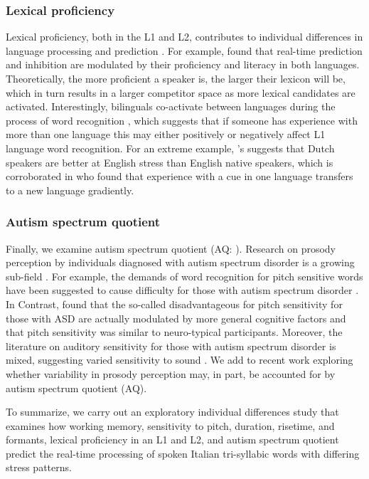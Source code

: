 \subsubsection{Lexical proficiency}
Lexical proficiency, both in the L1 and L2, contributes to individual differences in language processing and prediction \citep{Diependaele2013, Yap2012}. For example, \citep{Kukona2016} found that real-time prediction and inhibition are modulated by their proficiency and literacy in both languages. Theoretically, the more proficient a speaker is, the larger their lexicon will be, which in turn results in a larger competitor space as more lexical candidates are activated. Interestingly, bilinguals co-activate between languages during the process of word recognition \citep{kroll1997lexical, dijkstra2002architecture, marian2003competing}, which suggests that if someone has experience with more than one language this may either positively or negatively affect L1 language word recognition. For an extreme example, \cite{cutler2007dutch}'s suggests that Dutch speakers are better at English stress than English native speakers, which is corroborated in \cite{Pajak_2014} who found that experience with a cue in one language transfers to a new language gradiently. 

\subsubsection{Autism spectrum quotient}
Finally, we examine autism spectrum quotient (AQ: \cite{Baron-Cohen2001}). Research on prosody perception by individuals diagnosed with autism spectrum disorder is a growing sub-field  \citep[see ][]{Grice2023, Paul2005, McCann2003}. For example, the demands of word recognition for pitch sensitive words have been suggested to cause difficulty for those with autism spectrum disorder \citep{schelinski2020speech}. In Contrast, \cite{grossman2023relationship} found that the so-called disadvantageous for pitch sensitivity for those with ASD are actually modulated by more general cognitive factors and that pitch sensitivity was similar to neuro-typical participants. Moreover, the literature on auditory sensitivity for those with autism spectrum disorder is mixed, suggesting varied sensitivity to sound \citep{Kuiper2019, Stiegler2010}. We add to recent work \cite{Sinagra2022} exploring whether variability in prosody perception may, in part, be accounted for by autism spectrum quotient (AQ). 

To summarize, we carry out an exploratory individual differences study that examines how working memory, sensitivity to pitch, duration, risetime, and formants, lexical proficiency in an L1 and L2, and autism spectrum quotient predict the real-time processing of spoken Italian tri-syllabic words with differing stress patterns.

